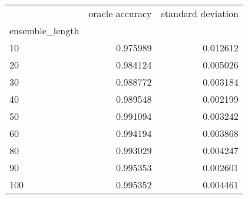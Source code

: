 \begin{tabular}{lrr}
\toprule
{} &  oracle accuracy &  standard deviation \\
ensemble\_length &                  &                     \\
\midrule
10              &         0.975989 &            0.012612 \\
20              &         0.984124 &            0.005026 \\
30              &         0.988772 &            0.003184 \\
40              &         0.989548 &            0.002199 \\
50              &         0.991094 &            0.003242 \\
60              &         0.994194 &            0.003868 \\
80              &         0.993029 &            0.004247 \\
90              &         0.995353 &            0.002601 \\
100             &         0.995352 &            0.004461 \\
\bottomrule
\end{tabular}

